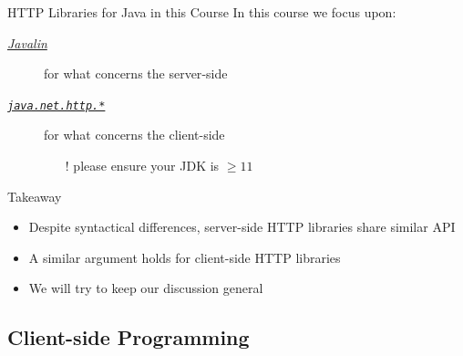 \documentclass[presentation]{beamer}\mode<presentation>{\usetheme{AMSCesenaPurpleAndGold}}
\begin{document}
\begin{frame}{HTTP Libraries for Java in this Course}
    In this course we focus upon:
    \begin{description}
        \item[\href{https://javalin.io/}{\emph{Javalin}}] for what concerns the \alert{server}-side
        \item[\href{https://docs.oracle.com/en/java/javase/11/docs/api/java.net.http/java/net/http/package-summary.html}{\emph{\texttt{java.net.http.*}}}] for what concerns the \alert{client}-side
        \begin{itemize}
            \item[!] please ensure your JDK is $\geq 11$
        \end{itemize}
    \end{description}

    \vfill

    \begin{block}{Takeaway}
        \begin{itemize}
            \item Despite syntactical differences, server-side HTTP libraries share similar API
            \item A similar argument holds for client-side HTTP libraries
            \item We will try to keep our discussion general
        \end{itemize}
    \end{block}

\end{frame}

\subsection{Client-side Programming}
\end{document}

